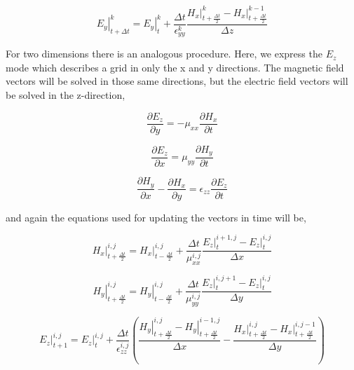 \documentclass[a4paper]{article}
\begin{document}
\begin{equation}
    \left. E_y \right\vert_{t+\Delta t}^{k} = \left. E_y \right\vert_{t}^{k} + \frac{\Delta t}{\epsilon_{yy}^{k}} \frac{\left. H_x \right\vert_{t+\frac{\Delta t}{2}}^{k} - \left. H_x \right\vert_{t+\frac{\Delta t}{2}}^{k-1}}{\Delta z} 
\end{equation}

For two dimensions there is an analogous procedure. Here, we express the $E_z$ mode which describes a grid in only the x and y directions. The magnetic field vectors will be solved in those same directions, but the electric field vectors will be solved in the z-direction, 

\begin{equation}
    \frac{\partial E_z}{\partial y} = - \mu_{xx} \frac{\partial H_x}{\partial t}
\end{equation}

\begin{equation}
    \frac{\partial E_z}{\partial x} = \mu_{yy} \frac{\partial H_y}{\partial t}
\end{equation}

\begin{equation}
    \frac{\partial H_y}{\partial x} - \frac{\partial H_x}{\partial y} = \epsilon_{zz} \frac{\partial E_z}{\partial t}
\end{equation}

and again the equations used for updating the vectors in time will be,

\begin{equation}
    \left. H_x \right\vert_{t+\frac{\Delta t}{2}}^{i,j} = \left. H_x \right\vert_{t-\frac{\Delta t}{2}}^{i,j} + \frac{\Delta t}{\mu_{xx}^{i,j}} \frac{\left. E_z \right\vert_{t}^{i+1,j} - \left. E_z \right\vert_{t}^{i,j}}{\Delta x} 
\end{equation}

\begin{equation}
    \left. H_y \right\vert_{t+\frac{\Delta t}{2}}^{i,j} = \left. H_y \right\vert_{t-\frac{\Delta t}{2}}^{i,j} + \frac{\Delta t}{\mu_{yy}^{i,j}} \frac{\left. E_z \right\vert_{t}^{i,j+1} - \left. E_z \right\vert_{t}^{i,j}}{\Delta y}
\end{equation}

\begin{equation}
    \left. E_z \right\vert_{t+1}^{i,j} = \left. E_z \right\vert_{t}^{i,j} + \frac{\Delta t}{\epsilon_{zz}^{i,j}} \left(
\frac{\left. H_y \right\vert_{t+\frac{\Delta t}{2}}^{i,j} - \left. H_y \right\vert_{t+\frac{\Delta t}{2}}^{i-1,j}}{\Delta x} - \frac{\left. H_x \right\vert_{t+\frac{\Delta t}{2}}^{i,j} - \left. H_x \right\vert_{t+\frac{\Delta t}{2}}^{i,j-1}}{\Delta y} \right)
\end{equation}
\end{document}
